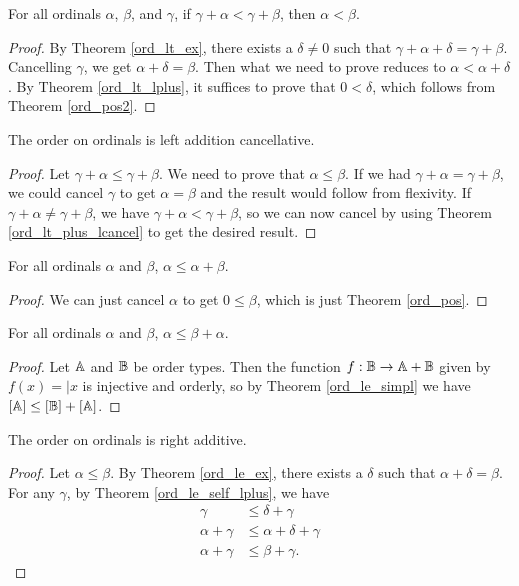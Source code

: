 \documentclass[../../math.tex]{subfiles}
\begin{document}
\begin{theorem} \label{ord_lt_plus_lcancel}
    For all ordinals $\alpha$, $\beta$, and $\gamma$, if $\gamma + \alpha <
    \gamma + \beta$, then $\alpha < \beta$.
\end{theorem}
\begin{proof}
    By Theorem \ref{ord_lt_ex}, there exists a $\delta \neq 0$ such that $\gamma
    + \alpha + \delta = \gamma + \beta$.  Cancelling $\gamma$, we get $\alpha +
    \delta = \beta$.  Then what we need to prove reduces to $\alpha < \alpha +
    \delta$.  By Theorem \ref{ord_lt_lplus}, it suffices to prove that $0 <
    \delta$, which follows from Theorem \ref{ord_pos2}.
\end{proof}

\begin{instance}
    The order on ordinals is left addition cancellative.
\end{instance}
\begin{proof}
    Let $\gamma + \alpha \leq \gamma + \beta$.  We need to prove that $\alpha
    \leq \beta$.  If we had $\gamma + \alpha = \gamma + \beta$, we could cancel
    $\gamma$ to get $\alpha = \beta$ and the result would follow from flexivity.
    If $\gamma + \alpha \neq \gamma + \beta$, we have $\gamma + \alpha < \gamma
    + \beta$, so we can now cancel by using Theorem \ref{ord_lt_plus_lcancel} to
    get the desired result.
\end{proof}

\begin{theorem} \label{ord_le_self_rplus}
    For all ordinals $\alpha$ and $\beta$, $\alpha \leq \alpha + \beta$.
\end{theorem}
\begin{proof}
    We can just cancel $\alpha$ to get $0 \leq \beta$, which is just Theorem
    \ref{ord_pos}.
\end{proof}

\begin{theorem} \label{ord_le_self_lplus}
    For all ordinals $\alpha$ and $\beta$, $\alpha \leq \beta + \alpha$.
\end{theorem}
\begin{proof}
    Let $\mathbb{A}$ and $\mathbb{B}$ be order types.  Then the function $f : \mathbb{B} \to \mathbb{A} + \mathbb{B}$
    given by $f(x) = |x$ is injective and orderly, so by Theorem
    \ref{ord_le_simpl} we have $[\mathbb{A}] \leq [\mathbb{B}] + [\mathbb{A}]$.
\end{proof}

\begin{instance}
    The order on ordinals is right additive.
\end{instance}
\begin{proof}
    Let $\alpha \leq \beta$.  By Theorem \ref{ord_le_ex}, there exists a
    $\delta$ such that $\alpha + \delta = \beta$.  For any $\gamma$, by Theorem
    \ref{ord_le_self_lplus}, we have
    \begin{align*}
        \gamma &\leq \delta + \gamma \\
        \alpha + \gamma &\leq \alpha + \delta + \gamma \\
        \alpha + \gamma &\leq \beta + \gamma.
    \end{align*}
\end{proof}
\end{document}
